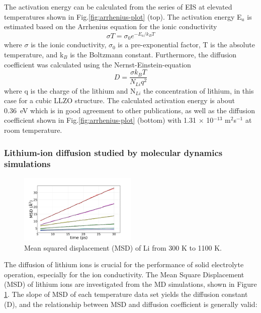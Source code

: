 \documentclass[twoside,twocolumn,9pt]{article}
\begin{document}
The activation energy can be calculated from the series of EIS at elevated temperatures shown in Fig.\ref{fig:arrhenius-plot} (top).
The activation energy E$_a$ is estimated based on the Arrhenius equation for the ionic conductivity
\begin{equation}
\sigma T = \sigma_0 e^{-E_a/k_B T}
\label{eq:Arrhenius-equation}
\end{equation}
where $\sigma$ is the ionic conductivity, $\sigma_0$ is a pre-exponential factor, T is the absolute temperature, and k$_B$ is the Boltzmann constant.
Furthermore, the diffusion coefficient was calculated using the Nernst-Einstein-equation
\begin{equation}
D=\frac{\sigma k_B T}{N_{Li} q^2}
\label{eq:Nernst-Einstein-equation}
\end{equation}
where q is the charge of the lithium and N$_{Li}$ the concentration of lithium, in this case for a cubic LLZO structure.
The calculated activation energy is about 0.36~eV which is in good agreement to other publications,
as well as the diffusion coefficient shown in Fig.\ref{fig:arrhenius-plot} (bottom) with 1.31 $\times$ 10$^{-13}$ m$^2$s$^{-1}$ at room temperature.





\subsubsection{Lithium-ion diffusion studied by molecular dynamics simulations}

\begin{figure}[t]
\centering
\includegraphics[width=0.5\textwidth]{Pics/MSD.pdf}
\caption{Mean squared displacement (MSD) of Li from 300 K to 1100 K.}
\label{fig:msd}
\end{figure}

The diffusion of lithium ions is crucial for the performance of solid electrolyte operation, especially for the ion conductivity.
The Mean Square Displacement (MSD) of lithium ions are investigated from the MD simulations, shown in Figure \ref{fig:msd}.
The slope of MSD of each temperature data set yields the diffusion constant (D), and the relationship between MSD and diffusion coefficient is generally valid:
\end{document}
